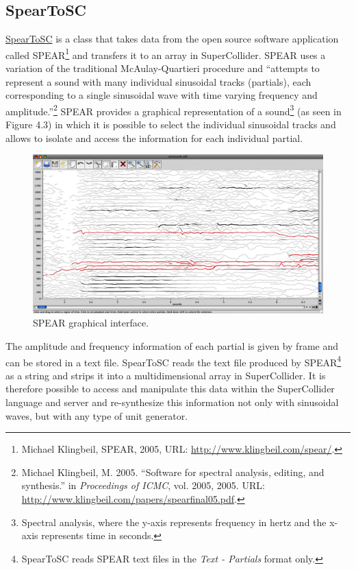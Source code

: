 \hypertarget{spearsc}{}
\subsection{SpearToSC}

\href{http://github.com/freuben/FedeLib/blob/master/SpearToSC/SpearToSC.sc}{SpearToSC} is a class that takes data from the open source software application called SPEAR\footnote{Michael Klingbeil, SPEAR, 2005, URL: \href{http://www.klingbeil.com/spear/}{http://www.klingbeil.com/spear/}.} and transfers it to an array in SuperCollider. SPEAR uses a variation of the traditional McAulay-Quartieri procedure and ``attempts to represent a sound with many individual sinusoidal tracks (partials), each corresponding to a single sinusoidal wave with time varying frequency and amplitude.''\footnote{Michael Klingbeil, M. 2005. ``Software for spectral analysis, editing, and synthesis.'' in \emph{Proceedings of ICMC}, vol. 2005, 2005. URL: \href{http://www.klingbeil.com/papers/spearfinal05.pdf}{http://www.klingbeil.com/papers/spearfinal05.pdf}.} SPEAR provides a graphical representation of a sound\footnote{Spectral analysis, where the y-axis represents frequency in hertz and the x-axis represents time in seconds.} (as seen in Figure 4.3) in which it is possible to select the individual sinusoidal tracks and allows to isolate and access the information for each individual partial. 
\begin{figure}[htbp] %
   \centering
   \includegraphics[width=15cm]{Chapter4/Spear1.tif} %
   \caption{SPEAR graphical interface.}
   \label{fig:example}
\end{figure}
The amplitude and frequency information of each partial is given by frame and can be stored in a text file. SpearToSC reads the text file produced by SPEAR\footnote{SpearToSC reads SPEAR text files in the \emph{Text - Partials} format only.} as a string and strips it into a multidimensional array in SuperCollider. It is therefore possible to access and manipulate this data within the SuperCollider language and server and re-synthesize this information not only with sinusoidal waves, but with any type of unit generator. 

